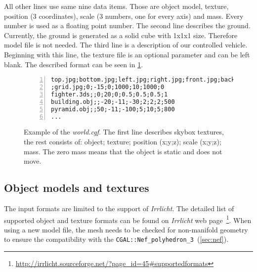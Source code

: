 All other lines use same nine data items. Those are object model, texture, position (3 coordinates), scale (3 numbers, one for every axis) and mass. Every number is used as a floating point number.
The second line describes the ground. Currently, the ground is generated as a solid cube with 1x1x1 size. Therefore model file is not needed. The third line is a description of our controlled vehicle. Beginning with this line, the texture file is an optional parameter and can be left blank. The described format can be seen in \cref{fig:world}.

\begin{figure}
\centering
\begin{Verbatim}[frame=single,numbers=left]
top.jpg;bottom.jpg;left.jpg;right.jpg;front.jpg;back.jpg
;grid.jpg;0;-15;0;1000;10;1000;0
fighter.3ds;;0;20;0;0.5;0.5;0.5;1
building.obj;;-20;-11;-30;2;2;2;500
pyramid.obj;;50;-11;-100;5;10;5;800
...
\end{Verbatim}
\caption{Example of the \emph{world.cgf}. The first line describes skybox textures, the rest consists of: object; texture; position (x;y;z); scale (x;y;z); mass. The zero mass means that the object is static and does not move.}
\label{fig:world}
\end{figure}


\subsection*{Object models and textures}
The input formats are limited to the support of \emph{Irrlicht}. The detailed list of supported object and texture formats can be found on \emph{Irrlicht} web page~\footnote{\url{http://irrlicht.sourceforge.net/?page\_id=45\#supportedformats}}. When using a new model file, the mesh needs to be checked for non-manifold geometry to ensure the compatibility with the {\tt CGAL::Nef\_polyhedron\_3}~(\cref{sec:nef}).


